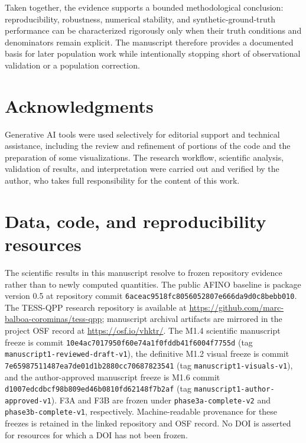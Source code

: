 \documentclass[11pt,a4paper]{article}
\begin{document}
Taken together, the evidence supports a bounded methodological conclusion: reproducibility, robustness, numerical stability, and synthetic-ground-truth performance can be characterized rigorously only when their truth conditions and denominators remain explicit. The manuscript therefore provides a documented basis for later population work while intentionally stopping short of observational validation or a population correction.

\section*{Acknowledgments}

Generative AI tools were used selectively for editorial support and technical assistance, including the review and refinement of portions of the code and the preparation of some visualizations. The research workflow, scientific analysis, validation of results, and interpretation were carried out and verified by the author, who takes full responsibility for the content of this work.
\section*{Data, code, and reproducibility resources}
\begin{sloppypar}
The scientific results in this manuscript resolve to frozen repository evidence rather than to newly computed quantities. The public AFINO baseline is package version 0.5 at repository commit \texttt{6aceac9518fc8056052807e666da9d0c8bebb010}. The TESS-QPP research repository is available at \url{https://github.com/marc-balboa-corominas/tess-qpp}; manuscript archival artifacts are mirrored in the project OSF record at \url{https://osf.io/vhktr/}. The M1.4 scientific manuscript freeze is commit \texttt{10e4ac7017950f60e74a1f0fddb41f6004f7755d} (tag \texttt{manuscript1-reviewed-draft-v1}), the definitive M1.2 visual freeze is commit \texttt{7e65987511487ea7de01d1b2880cc70687823541} (tag \texttt{manuscript1-visuals-v1}), and the author-approved manuscript freeze is M1.6 commit \texttt{d1007edcdbcf98b809ed46b0810fd62148f7b2af} (tag \texttt{manuscript1-author-approved-v1}). F3A and F3B are frozen under \texttt{phase3a-complete-v2} and \texttt{phase3b-complete-v1}, respectively. Machine-readable provenance for these freezes is retained in the linked repository and OSF record. No DOI is asserted for resources for which a DOI has not been frozen.
\end{sloppypar}

\clearpage
\printbibliography
\end{document}
